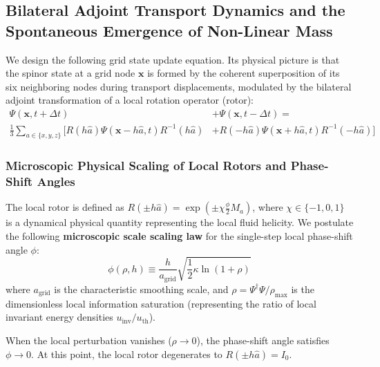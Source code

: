 \documentclass[12pt, a4paper]{article}
\begin{document}
\subsection{Bilateral Adjoint Transport Dynamics and the Spontaneous Emergence of Non-Linear Mass}

We design the following grid state update equation. Its physical picture is that the spinor state at a grid node $\mathbf{x}$ is formed by the coherent superposition of its six neighboring nodes during transport displacements, modulated by the bilateral adjoint transformation of a local rotation operator (rotor):
\begin{equation}
\label{eq:bilateral_adjoint}
\begin{split}
\Psi(\mathbf{x}, t+\Delta t) &+ \Psi(\mathbf{x}, t-\Delta t) = \\
\frac{1}{3} \sum_{a \in \{x, y, z\}} \Big[ R(h \hat{a}) \Psi(\mathbf{x} - h \hat{a}, t) R^{-1}(h \hat{a}) &+ R(-h \hat{a}) \Psi(\mathbf{x} + h \hat{a}, t) R^{-1}(-h \hat{a}) \Big]
\end{split}
\end{equation}

\subsubsection{Microscopic Physical Scaling of Local Rotors and Phase-Shift Angles}

The local rotor is defined as $R(\pm h \hat{a}) = \exp\left( \pm \chi \frac{\phi}{2} M_a \right)$, where $\chi \in \{-1, 0, 1\}$ is a dynamical physical quantity representing the local fluid helicity. We postulate the following \textbf{microscopic scale scaling law} for the single-step local phase-shift angle $\phi$:
\begin{equation}
\label{eq:phase_angle_scaling}
\phi(\rho, h) \equiv \frac{h}{a_{\text{grid}}} \sqrt{\frac{1}{2} \kappa \ln(1+\rho)}
\end{equation}
where $a_{\text{grid}}$ is the characteristic smoothing scale, and $\rho = \Psi^\dagger \Psi / \rho_{\text{max}}$ is the dimensionless local information saturation (representing the ratio of local invariant energy densities $u_{\text{inv}}/u_{\text{th}}$).

When the local perturbation vanishes ($\rho \to 0$), the phase-shift angle satisfies $\phi \to 0$. At this point, the local rotor degenerates to $R(\pm h \hat{a}) = I_0$.
\end{document}
